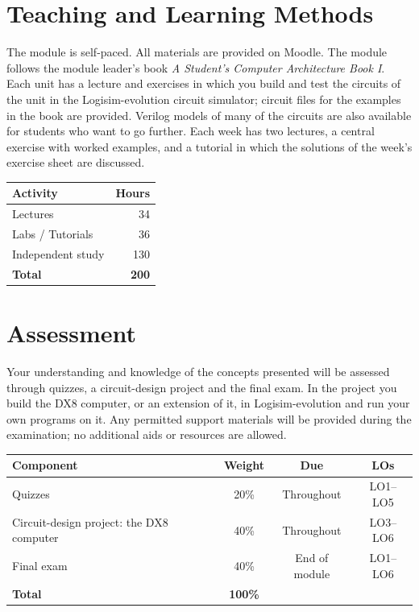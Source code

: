 \documentclass[11pt,a4paper]{article}
\begin{document}
\section{Teaching and Learning Methods}
The module is self-paced. All materials are provided on Moodle. The module follows
the module leader's book \textit{A Student's Computer Architecture Book I}. Each
unit has a lecture and exercises in which you build and test the circuits of the
unit in the Logisim-evolution circuit simulator; circuit files for the examples in
the book are provided. Verilog models of many of the circuits are also available
for students who want to go further.
Each week has two lectures, a central exercise with worked examples, and a tutorial
in which the solutions of the week's exercise sheet are discussed.

\begin{tabularx}{0.6\textwidth}{X r}
\toprule
\textbf{Activity} & \textbf{Hours} \\
\midrule
Lectures            & 34 \\
Labs / Tutorials    & 36 \\
Independent study   & 130 \\
\midrule
\textbf{Total}      & \textbf{200} \\
\bottomrule
\end{tabularx}

\section{Assessment}
Your understanding and knowledge of the concepts presented will be assessed
through quizzes, a circuit-design project and the final exam. In the project you
build the DX8 computer, or an extension of it, in Logisim-evolution and run your
own programs on it. Any permitted support materials will be provided during the
examination; no additional aids or resources are allowed.

\begin{tabularx}{\textwidth}{X c c c}
\toprule
\textbf{Component} & \textbf{Weight} & \textbf{Due} & \textbf{LOs} \\
\midrule
Quizzes & 20\% & Throughout & LO1--LO5 \\
Circuit-design project: the DX8 computer & 40\% & Throughout & LO3--LO6 \\
Final exam & 40\% & End of module & LO1--LO6 \\
\midrule
\textbf{Total} & \textbf{100\%} & & \\
\bottomrule
\end{tabularx}
\end{document}
